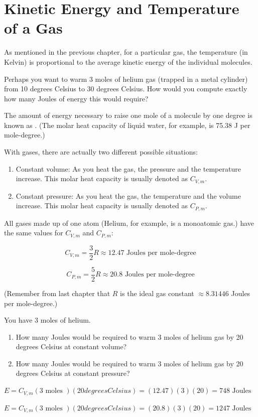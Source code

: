 \chapter{Kinetic Energy and Temperature of a Gas}

As mentioned in the previous chapter, for a particular gas,  the temperature (in Kelvin) is proportional to the average kinetic energy of the individual molecules. 

Perhaps you want to warm 3 moles of helium gas (trapped in a metal cylinder) from 10 degrees Celsius to 30 degrees Celsius.   
How would you compute exactly how many Joules of energy this would require?

The amount of energy necessary to raise one mole of a molecule by one degree is known as .  
(The molar heat capacity of liquid water, for example, is 75.38 J per mole-degree.)

With gases, there are actually two different possible situations:
\begin{enumerate}
\item Constant volume: As you heat the gas,  the pressure and the temperature increase.  This molar heat capacity is usually denoted as $C_{V,m}$.
\item Constant pressure: As you heat the gas,  the temperature and the volume increase.  This molar heat capacity  is usually denoted as $C_{P, m}$.
\end{enumerate}

All gases made up of one atom (Helium, for example, is a monoatomic gas.) have the same values for $C_{V,m}$ and $C_{P,m}$:

$$C_{V,m} = \frac{3}{2}R \approx 12.47 \text{ Joules per mole-degree}$$

$$C_{P,m} = \frac{5}{2}R \approx 20.8  \text{ Joules per mole-degree}$$

(Remember from last chapter that $R$ is the ideal gas constant $\approx 8.31446$ Joules per mole-degree.)

\begin{Exercise}[title={Warming Helium},  label=warming_helium]

You have 3 moles of helium.  
  
\begin{enumerate}

\item How many Joules would be required to warm 3 moles of helium gas by 20 degrees Celsius at constant volume?  

\item How many Joules would be required to warm 3 moles of helium gas by 20 degrees Celsius at constant pressure?  

\end{enumerate}


\end{Exercise}
\begin{Answer}[ref=warming_helium]

$E = C_{V,m} (3 \text{ moles }) (20 { degrees Celsius }) = (12.47)(3)(20) = 748 \text{ Joules }$

$E = C_{V,m} (3 \text{ moles }) (20 { degrees Celsius }) = (20.8)(3)(20) = 1247 \text{ Joules }$
\end{Answer}

